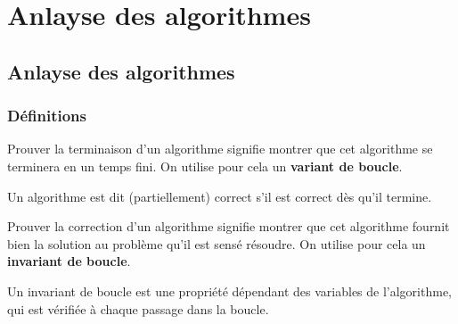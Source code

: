\setchapterpreamble[u]{\margintoc}

\chapter{Anlayse des algorithmes}





\section{Anlayse des algorithmes}

\subsection{Définitions}

\begin{defi}
Prouver la terminaison d'un algorithme signifie montrer que cet algorithme se terminera en un temps fini. On utilise pour cela un \textbf{variant de boucle}.
\end{defi}

\begin{defi}
Un algorithme est dit (partiellement) correct s'il est correct dès qu'il termine. 

\end{defi}
Prouver la correction d'un algorithme signifie montrer que cet algorithme fournit bien la solution au problème qu'il est sensé résoudre. On utilise pour cela un \textbf{invariant de boucle}.

\begin{defi}
Un invariant de boucle est une propriété dépendant des variables de l’algorithme, qui est vérifiée à
chaque passage dans la boucle.
\end{defi}


